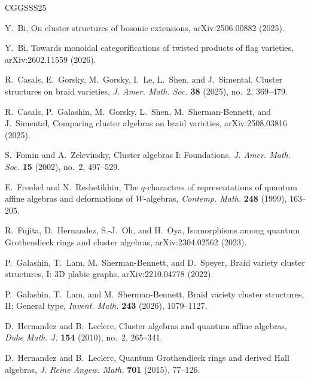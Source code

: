 \documentclass[12pt, reqno]{amsart}
\theoremstyle{plain}
\theoremstyle{definition}
\numberwithin{equation}{section}
\begin{document}
\begin{thebibliography}{CGGSSS25}

Y.~Bi,
\newblock On cluster structures of bosonic extensions,
\newblock arXiv:2506.00882 (2025).

Y.~Bi,
\newblock Towards monoidal categorifications of twisted products of flag
varieties,
\newblock arXiv:2602.11559 (2026).

R.~Casals, E.~Gorsky, M.~Gorsky, I.~Le, L.~Shen, and J.~Simental,
\newblock Cluster structures on braid varieties,
\newblock \emph{J. Amer. Math. Soc.} \textbf{38} (2025), no.~2,
369--479.

R.~Casals, P.~Galashin, M.~Gorsky, L.~Shen, M.~Sherman-Bennett,
and J.~Simental,
\newblock Comparing cluster algebras on braid varieties,
\newblock arXiv:2508.03816 (2025).

S.~Fomin and A.~Zelevinsky,
\newblock Cluster algebras I: Foundations,
\newblock \emph{J. Amer. Math. Soc.} \textbf{15} (2002), no.~2,
497--529.

E.~Frenkel and N.~Reshetikhin,
\newblock The \(q\)-characters of representations of quantum affine
algebras and deformations of \(W\)-algebras,
\newblock \emph{Contemp. Math.} \textbf{248} (1999), 163--205.

R.~Fujita, D.~Hernandez, S.-J.~Oh, and H.~Oya,
\newblock Isomorphisms among quantum Grothendieck rings and cluster
algebras,
\newblock arXiv:2304.02562 (2023).

P.~Galashin, T.~Lam, M.~Sherman-Bennett, and D.~Speyer,
\newblock Braid variety cluster structures, I: \(3\)D plabic graphs,
\newblock arXiv:2210.04778 (2022).

P.~Galashin, T.~Lam, and M.~Sherman-Bennett,
\newblock Braid variety cluster structures, II: General type,
\newblock \emph{Invent. Math.} \textbf{243} (2026), 1079--1127.

D.~Hernandez and B.~Leclerc,
\newblock Cluster algebras and quantum affine algebras,
\newblock \emph{Duke Math. J.} \textbf{154} (2010), no.~2, 265--341.

D.~Hernandez and B.~Leclerc,
\newblock Quantum Grothendieck rings and derived Hall algebras,
\newblock \emph{J. Reine Angew. Math.} \textbf{701} (2015), 77--126.


\end{thebibliography}
\end{document}
